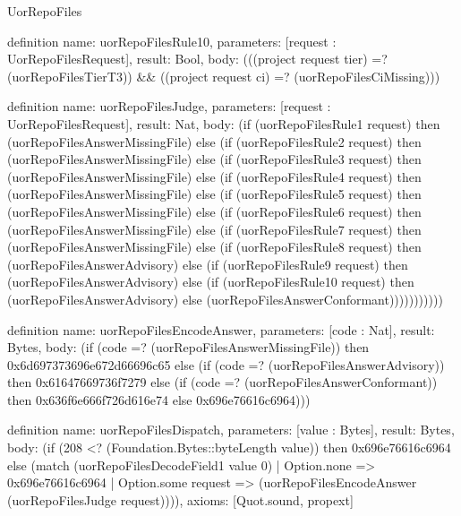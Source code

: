 \begin{lexlean}{UorRepoFiles}
\begin{semanticmodule}
definition{
  name: uorRepoFilesRule10,
  parameters: [request : UorRepoFilesRequest],
  result: Bool,
  body: (((project request tier) =? (uorRepoFilesTierT3)) && ((project request ci) =? (uorRepoFilesCiMissing)))
}

definition{
  name: uorRepoFilesJudge,
  parameters: [request : UorRepoFilesRequest],
  result: Nat,
  body: (if (uorRepoFilesRule1 request) then (uorRepoFilesAnswerMissingFile) else (if (uorRepoFilesRule2 request) then (uorRepoFilesAnswerMissingFile) else (if (uorRepoFilesRule3 request) then (uorRepoFilesAnswerMissingFile) else (if (uorRepoFilesRule4 request) then (uorRepoFilesAnswerMissingFile) else (if (uorRepoFilesRule5 request) then (uorRepoFilesAnswerMissingFile) else (if (uorRepoFilesRule6 request) then (uorRepoFilesAnswerMissingFile) else (if (uorRepoFilesRule7 request) then (uorRepoFilesAnswerMissingFile) else (if (uorRepoFilesRule8 request) then (uorRepoFilesAnswerAdvisory) else (if (uorRepoFilesRule9 request) then (uorRepoFilesAnswerAdvisory) else (if (uorRepoFilesRule10 request) then (uorRepoFilesAnswerAdvisory) else (uorRepoFilesAnswerConformant)))))))))))
}

definition{
  name: uorRepoFilesEncodeAnswer,
  parameters: [code : Nat],
  result: Bytes,
  body: (if (code =? (uorRepoFilesAnswerMissingFile)) then 0x6d697373696e672d66696c65 else (if (code =? (uorRepoFilesAnswerAdvisory)) then 0x61647669736f7279 else (if (code =? (uorRepoFilesAnswerConformant)) then 0x636f6e666f726d616e74 else 0x696e76616c6964)))
}

definition{
  name: uorRepoFilesDispatch,
  parameters: [value : Bytes],
  result: Bytes,
  body: (if (208 <? (Foundation.Bytes::byteLength value)) then 0x696e76616c6964 else (match (uorRepoFilesDecodeField1 value 0)
    | Option.none => 0x696e76616c6964
    | Option.some request => (uorRepoFilesEncodeAnswer (uorRepoFilesJudge request)))),
  axioms: [Quot.sound, propext]
}
\end{semanticmodule}
\end{lexlean}

